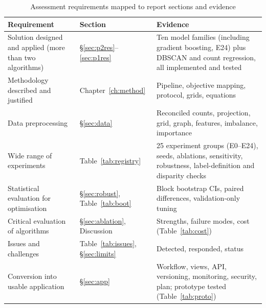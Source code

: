 \documentclass[11pt,a4paper]{report}
\begin{document}
\begin{table}[H]
\centering\scriptsize
\caption{Assessment requirements mapped to report sections and evidence}
\label{tab:req}
\begin{tabularx}{\textwidth}{@{}L{4.2cm} L{3.4cm} Y@{}}
\toprule
Requirement & Section & Evidence\\
\midrule
Solution designed and applied (more than two algorithms) & \S\ref{sec:p2res}--\ref{sec:p1res} & Ten model families (including gradient boosting, E24) plus DBSCAN and count regression, all implemented and tested\\
Methodology described and justified & Chapter~\ref{ch:method} & Pipeline, objective mapping, protocol, grids, equations\\
Data preprocessing & \S\ref{sec:data} & Reconciled counts, projection, grid, graph, features, imbalance, importance\\
Wide range of experiments & Table~\ref{tab:registry} & 25 experiment groups (E0--E24), seeds, ablations, sensitivity, robustness, label-definition and disparity checks\\
Statistical evaluation for optimisation & \S\ref{sec:robust}, Table~\ref{tab:boot} & Block bootstrap CIs, paired differences, validation-only tuning\\
Critical evaluation of algorithms & \S\ref{sec:ablation}, Discussion & Strengths, failure modes, cost (Table~\ref{tab:cost})\\
Issues and challenges & Table~\ref{tab:issues}, \S\ref{sec:limits} & Detected, responded, status\\
Conversion into usable application & \S\ref{sec:app} & Workflow, views, API, versioning, monitoring, security, plan; prototype tested (Table~\ref{tab:proto})\\
\bottomrule
\end{tabularx}
\end{table}
\end{document}
